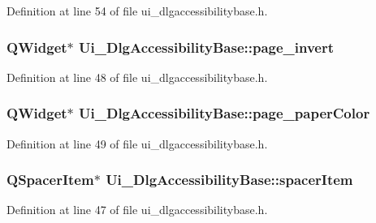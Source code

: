 Definition at line 54 of file ui\+\_\+dlgaccessibilitybase.\+h.

\hypertarget{classUi__DlgAccessibilityBase_a07a676aad0645e0d37a146419d0e4f38}{
\subsubsection[{page\+\_\+invert}]{\setlength{\rightskip}{0pt plus 5cm}Q\+Widget$\ast$ Ui\+\_\+\+Dlg\+Accessibility\+Base\+::page\+\_\+invert}}\label{classUi__DlgAccessibilityBase_a07a676aad0645e0d37a146419d0e4f38}


Definition at line 48 of file ui\+\_\+dlgaccessibilitybase.\+h.

\hypertarget{classUi__DlgAccessibilityBase_acac9f9a8e065b0a8d203c932f816b0ef}{
\subsubsection[{page\+\_\+paper\+Color}]{\setlength{\rightskip}{0pt plus 5cm}Q\+Widget$\ast$ Ui\+\_\+\+Dlg\+Accessibility\+Base\+::page\+\_\+paper\+Color}}\label{classUi__DlgAccessibilityBase_acac9f9a8e065b0a8d203c932f816b0ef}


Definition at line 49 of file ui\+\_\+dlgaccessibilitybase.\+h.

\hypertarget{classUi__DlgAccessibilityBase_a45af3bd1e7e9099df59dbc0cf5fe1c1a}{
\subsubsection[{spacer\+Item}]{\setlength{\rightskip}{0pt plus 5cm}Q\+Spacer\+Item$\ast$ Ui\+\_\+\+Dlg\+Accessibility\+Base\+::spacer\+Item}}\label{classUi__DlgAccessibilityBase_a45af3bd1e7e9099df59dbc0cf5fe1c1a}


Definition at line 47 of file ui\+\_\+dlgaccessibilitybase.\+h.

